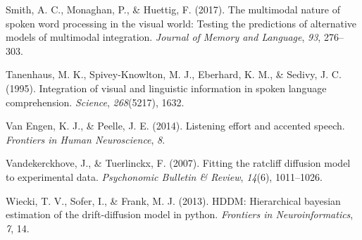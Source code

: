 \documentclass[10pt, letterpaper]{article}
\begin{document}
\hypertarget{ref-smith2017multimodal}{}
Smith, A. C., Monaghan, P., \& Huettig, F. (2017). The multimodal nature
of spoken word processing in the visual world: Testing the predictions
of alternative models of multimodal integration. \emph{Journal of Memory
and Language}, \emph{93}, 276--303.

\hypertarget{ref-tanenhaus1995integration}{}
Tanenhaus, M. K., Spivey-Knowlton, M. J., Eberhard, K. M., \& Sedivy, J.
C. (1995). Integration of visual and linguistic information in spoken
language comprehension. \emph{Science}, \emph{268}(5217), 1632.

\hypertarget{ref-van2014listening}{}
Van Engen, K. J., \& Peelle, J. E. (2014). Listening effort and accented
speech. \emph{Frontiers in Human Neuroscience}, \emph{8}.

\hypertarget{ref-vandekerckhove2007fitting}{}
Vandekerckhove, J., \& Tuerlinckx, F. (2007). Fitting the ratcliff
diffusion model to experimental data. \emph{Psychonomic Bulletin \&
Review}, \emph{14}(6), 1011--1026.

\hypertarget{ref-wiecki2013hddm}{}
Wiecki, T. V., Sofer, I., \& Frank, M. J. (2013). HDDM: Hierarchical
bayesian estimation of the drift-diffusion model in python.
\emph{Frontiers in Neuroinformatics}, \emph{7}, 14.
\end{document}

